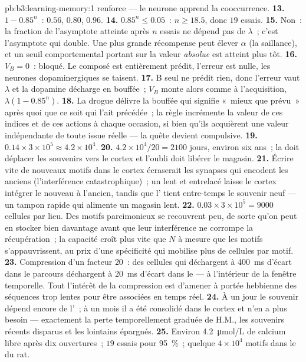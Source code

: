 \begin{solution}{pb:b3:learning-memory:1}
renforce --- le neurone apprend la cooccurrence.
\textbf{13.} $1 - 0.85^{n}$~: $0.56$, $0.80$, $0.96$.
\textbf{14.} $0.85^{n} \le 0.05$~: $n \ge 18.5$, donc $19$ essais.
\textbf{15.} Non~: la fraction de l'asymptote atteinte après $n$ essais
ne dépend pas de $\lambda$~; c'est l'asymptote qui double. Une plus
grande récompense peut élever $\alpha$ (la saillance), et un seuil
comportemental portant sur la valeur \emph{absolue} est atteint plus tôt.
\textbf{16.} $V_{B} = 0$~: bloqué. Le composé est entièrement prédit,
l'erreur est nulle, les neurones dopaminergiques se taisent.
\textbf{17.} B seul ne prédit rien, donc l'erreur vaut $\lambda$ et la
dopamine décharge en bouffée~; $V_{B}$ monte alors comme à
l'acquisition, $\lambda(1 -
0.85^{n})$.
\textbf{18.} La drogue délivre la bouffée qui signifie «~mieux que
prévu~» après quoi que ce soit qui l'ait précédée~; la règle incrémente
la valeur de ces indices et de ces actions à chaque occasion, si bien
qu'ils acquièrent une valeur indépendante de toute issue réelle --- la
quête devient compulsive.
\textbf{19.} $0.14\times 3\times 10^{5} \approx 4.2\times 10^{4}$.
\textbf{20.} $4.2\times 10^{4}/20 = 2100$ jours, environ six ans~; la
 doit déplacer les souvenirs vers le cortex et l'oubli doit
libérer le magasin.
\textbf{21.} Écrire vite de nouveaux motifs dans le cortex écraserait
les synapses qui encodent les anciens (l'interférence catastrophique)~;
un  lent et entrelacé laisse le cortex intégrer le nouveau à
l'ancien, tandis que l' tient entre-temps le souvenir neuf ---
un tampon rapide qui alimente un magasin lent.
\textbf{22.} $0.03\times 3\times 10^{5} = 9000$ cellules par lieu. Des
motifs parcimonieux se recouvrent peu, de sorte qu'on peut en stocker
bien davantage avant que leur interférence ne corrompe la récupération~;
la capacité croît plus vite que $N$ à mesure que les motifs
s'appauvrissent, au prix d'une spécificité qui mobilise plus de cellules
par motif.
\textbf{23.} Compression d'un facteur $20$~: des cellules qui déchargent
à \qty{400}{ms} d'écart dans le parcours déchargent à \qty{20}{ms}
d'écart dans le  --- à l'intérieur de la fenêtre temporelle. Tout
l'intérêt de la compression est d'amener à portée hebbienne des
séquences trop lentes pour être associées en temps réel.
\textbf{24.} À un jour le souvenir dépend encore de l'~; à un
mois il a été consolidé dans le cortex et n'en a plus besoin ---
exactement la perte temporellement graduée de H.M., les souvenirs
récents disparus et les lointains épargnés.
\textbf{25.} Environ \qty{4.2}{\micro mol/L} de calcium libre après dix
ouvertures~; $19$ essais pour \qty{95}{\%}~; quelque $4\times 10^{4}$
motifs dans le  du rat.
\end{solution}
